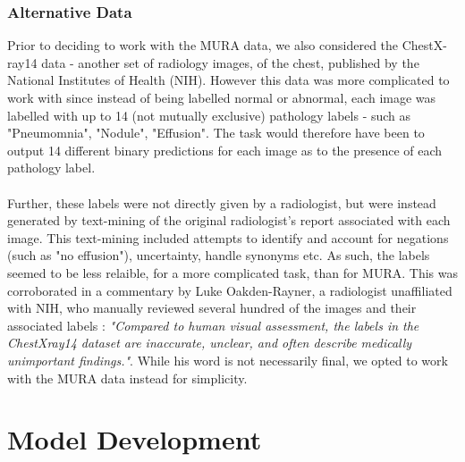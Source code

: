 \documentclass[11pt]{article} %
\theoremstyle{plain}
\theoremstyle{definition}
\begin{document}
\subsubsection{Alternative Data}
Prior to deciding to work with the MURA data, we also considered the ChestX-ray14  data \cite{ChestXray-14} - another set of radiology images, of the chest, published by the National Institutes of Health (NIH). However this data was more complicated to work with since instead of being labelled normal or abnormal, each image was labelled with up to 14 (not mutually exclusive) pathology labels - such as "Pneumomnia", "Nodule", "Effusion". The task would therefore have been to output 14 different binary predictions for each image as to the presence of each pathology label. 
\\
\\
\noindent
Further, these labels were not directly given by a radiologist, but were instead generated by text-mining of the original radiologist's report associated with each image. This text-mining included attempts to identify and account for negations (such as "no effusion"), uncertainty, handle synonyms etc. As such, the labels seemed to be less relaible, for a more complicated task, than for MURA. This was corroborated in a commentary by Luke Oakden-Rayner, a radiologist unaffiliated with NIH, who manually reviewed several hundred of the images and their associated labels \cite{Oakden-Rayner-Commentary}: \textit{"Compared to human visual assessment, the labels in the ChestXray14 dataset are inaccurate, unclear, and often describe medically unimportant findings."}. While his word is not necessarily final, we opted to work with the MURA data instead for simplicity.


\newpage
\section{Model Development}
\end{document}
